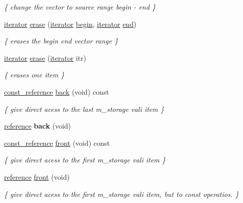 \begin{DoxyCompactItemize}
\begin{DoxyCompactList}\small\item\em \{ change the vector to source range begin -\/ end \} \end{DoxyCompactList}\item 
\hyperlink{classMyIterator}{iterator} \hyperlink{classvector_acf8299f95b39286a0e249deb44b19413}{erase} (\hyperlink{classMyIterator}{iterator} \hyperlink{classvector_a22ebe2c584d5e94106e10eef4e8d7baa}{begin}, \hyperlink{classMyIterator}{iterator} \hyperlink{classvector_aad5e92e775a9fa4f98b5b0666b6c0e2d}{end})
\begin{DoxyCompactList}\small\item\em \{ erases the begin end vector range \} \end{DoxyCompactList}\item 
\hyperlink{classMyIterator}{iterator} \hyperlink{classvector_a33d4637bc1990495dc54171e36853d1b}{erase} (\hyperlink{classMyIterator}{iterator} itr)
\begin{DoxyCompactList}\small\item\em \{ erases one item \} \end{DoxyCompactList}\item 
\hyperlink{classvector_aad263433b4072dfbc26ace0df6441960}{const\+\_\+reference} \hyperlink{classvector_a83cb5f4dec5bbecea7267cf1981f2314}{back} (void) const
\begin{DoxyCompactList}\small\item\em \{ give direct acess to the last m\+\_\+storage vali item \} \end{DoxyCompactList}\item 
\mbox{\label{classvector_a07933da84dadc0ce3314c2cd2f89faac}} 
\hyperlink{classvector_a068ad546247a09ea9dd025658ad69348}{reference} {\bfseries back} (void)
\item 
\hyperlink{classvector_aad263433b4072dfbc26ace0df6441960}{const\+\_\+reference} \hyperlink{classvector_a0eaefdda2a1e218edfc73fc259d51705}{front} (void) const
\begin{DoxyCompactList}\small\item\em \{ give direct acess to the first m\+\_\+storage vali item \} \end{DoxyCompactList}\item 
\hyperlink{classvector_a068ad546247a09ea9dd025658ad69348}{reference} \hyperlink{classvector_a289b6dbbbd572cea8da012ed80ebff5d}{front} (void)
\begin{DoxyCompactList}\small\item\em \{ give direct acess to the first m\+\_\+storage vali item, but to const operatios. \} \end{DoxyCompactList}\item 

\end{DoxyCompactItemize}
